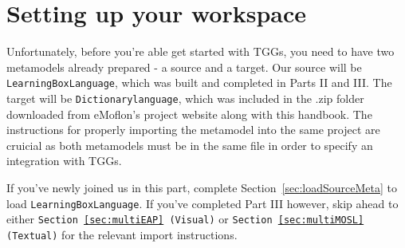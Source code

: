 \newpage
\section{Setting up your workspace}
\genHeader

Unfortunately, before you're able get started with  TGGs, you need to have two metamodels already prepared - a source and a target. Our source will be
\texttt{LearningBoxLanguage}, which was built and completed in Parts II and III. The target will be \texttt{Dictionarylanguage}, which was included in the .zip
folder downloaded from eMoflon's project website along with this handbook. The instructions for properly importing the metamodel into the same project are
cruicial as both metamodels must be in the same file in order to specify an integration with TGGs.

If you've newly joined us in this part, complete Section~\ref{sec:loadSourceMeta} to load \texttt{Learn\-ing\-Box\-Lang\-uage}. If you've completed Part III
however, skip ahead to either \texttt{Section~\ref{sec:multiEAP} (Visual)} or \texttt{Section~\ref{sec:multiMOSL} (Textual)} for the relevant import
instructions.

